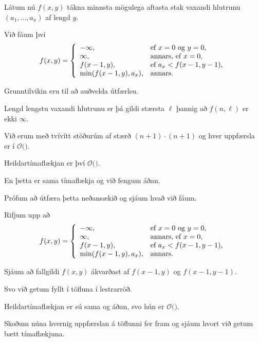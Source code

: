 {
	{
		\item<1-> Látum nú $f(x, y)$ tákna minnsta mögulega aftasta stak vaxandi hlutrunu $(a_1, \dots, a_x)$ af lengd $y$.
		\item<2-> Við fáum því
		\[
			f(x, y) = \left \{
			\env{array}
			{ {l l}
				-\infty, & \text{ef $x = 0$ og $y = 0$,} \\
				\infty, & \text{annars, ef $x = 0$,} \\
				f(x - 1, y), & \text{ef $a_x < f(x - 1, y - 1)$,} \\
				\min(f(x - 1, y), a_x), & \text{annars.}
			}
			\right .
		\]
		\item<3-> Grunntilvikin eru til að auðvelda útfærlsu.
		\item<4-> Lengd lengstu vaxandi hlutrunu er þá gildi stærsta $\ell$ þannig að $f(n, \ell)$ er ekki $\infty$. 
	}
}

{
}

{
	{
		\item<1-> Við erum með tvívítt stöðurúm af stærð $(n + 1) \cdot (n + 1)$ og hver uppfærsla er í $\mathcal{O}($\onslide<2->{$\,1\,$}$)$.
		\item<3-> Heildartímaflækjan er því $\mathcal{O}($\onslide<4->{$n^2$}$)$.
		\item<5-> En þetta er sama tímaflækja og við fengum áðan.
		\item<6-> Prófum að útfæra þetta neðansækið og sjáum hvað við fáum.
	}
}

{
	{
		\item<1-> Rifjum upp að
		\[
			f(x, y) = \left \{
			\env{array}
			{ {l l}
				-\infty, & \text{ef $x = 0$ og $y = 0$,} \\
				\infty, & \text{annars, ef $x = 0$,} \\
				f(x - 1, y), & \text{ef $a_x < f(x - 1, y - 1)$,} \\
				\min(f(x - 1, y), a_x), & \text{annars.}
			}
			\right .
		\]
		\item<2-> Sjáum að fallgildi $f(x, y)$ ákvarðast af $f(x - 1, y)$ og $f(x - 1, y - 1)$.
		\item<3-> Svo við getum fyllt í töfluna í lestrarröð.
	}
}

{
}

{
	{
		\item<1-> Heildartímaflækjan er sú sama og áðan, svo hún er $\mathcal{O}($\onslide<2->{$n^2$}$)$.
		\item<3-> Skoðum núna hvernig uppfærslan á töflunni fer fram og sjáum hvort við getum bætt tímaflækjuna.
	}
}


